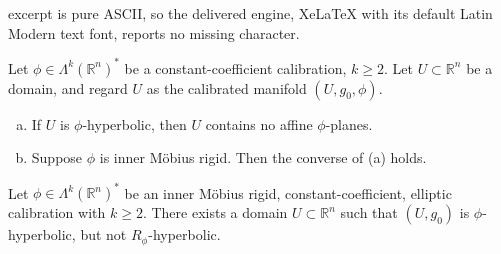 \documentclass[10pt,a4paper]{amsart}
\newcommand{\R}{\mathbb{R}}
\begin{document}
excerpt is pure ASCII, so the delivered engine, XeLaTeX with its default Latin Modern text font, reports no missing character.
\begin{thm} \label{prop:ConfRigid} Let $\phi \in \Lambda^k(\R^n)^*$ be a constant-coefficient calibration, $k \geq 2$.  Let $U \subset \R^n$ be a domain, and regard $U$ as the calibrated manifold $(U, g_0, \phi)$.
\begin{enumerate}[(a)]
\item If $U$ is $\phi$-hyperbolic, then $U$ contains no affine $\phi$-planes.
\item Suppose $\phi$ is inner M\"{o}bius rigid.  Then the converse of (a) holds.
\end{enumerate}
\end{thm}

\begin{thm} \label{thm:CounterConverse} Let $\phi \in \Lambda^k(\R^n)^*$ be an inner M\"{o}bius rigid, constant-coefficient, elliptic calibration with $k \geq 2$.  There exists a domain $U \subset \R^n$ such that $(U,g_0)$ is $\phi$-hyperbolic, but not $R_\phi$-hyperbolic.
\end{thm}
\end{document}
